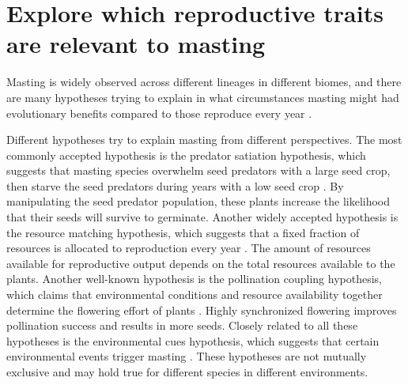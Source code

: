 \documentclass[11pt,letter]{article}
\begin{document}
\section{Explore which reproductive traits are relevant to masting}
Masting is widely observed across different lineages in different biomes, and there are many hypotheses trying to explain in what circumstances masting might had evolutionary benefits compared to those reproduce every year \citep{koenig2021brief, waller1979models}.\par
Different hypotheses try to explain masting from different perspectives. The most commonly accepted hypothesis is the predator satiation hypothesis, which suggests that masting species overwhelm seed predators with a large seed crop, then starve the seed predators during years with a low seed crop \citep{janzen1971seed}. By manipulating the seed predator population, these plants increase the likelihood that their seeds will survive to germinate. Another widely accepted hypothesis is the resource matching hypothesis, which suggests that a fixed fraction of resources is allocated to reproduction every year \citep{kelly1994evolutionary}. The amount of resources available for reproductive output depends on the total resources available to the plants. Another well-known hypothesis is the pollination coupling hypothesis, which claims that environmental conditions and resource availability together determine the flowering effort of plants \citep{crone2014resource}. Highly synchronized flowering improves pollination success and results in more seeds. Closely related to all these hypotheses is the environmental cues hypothesis, which suggests that certain environmental events trigger masting \citep{pearse2016mechanisms}. These hypotheses are not mutually exclusive and may hold true for different species in different environments.\par
\end{document}
